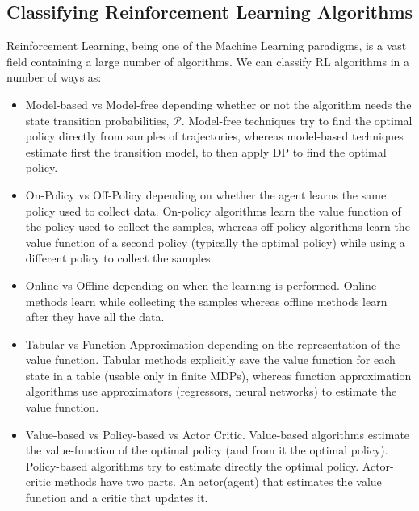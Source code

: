 \subsection{Classifying Reinforcement Learning Algorithms}
Reinforcement Learning, being one of the Machine Learning paradigms, is a vast field containing a large number of algorithms. We can classify RL algorithms in a number of ways as:
\begin{itemize}
\item Model-based vs Model-free depending whether or not the algorithm needs the state transition probabilities, $\mathcal{P}$. Model-free techniques try to find the optimal policy directly from samples of trajectories, whereas model-based techniques estimate first the transition model, to then apply DP to find the optimal policy.
\item On-Policy vs Off-Policy depending on whether the agent learns the same policy used to collect data. On-policy algorithms learn the value function of the policy used to collect the samples, whereas off-policy algorithms learn the value function of a second policy (typically the optimal policy) while using a different policy to collect the samples.\
\item Online vs Offline depending on when the learning is performed. Online methods learn while collecting the samples whereas offline methods learn after they have all the data.
\item Tabular vs Function Approximation depending on the representation of the value function. Tabular methods explicitly save the value function for each state in a table (usable only in finite MDPs), whereas function approximation algorithms use approximators (regressors, neural networks) to estimate the value function.
\item Value-based vs Policy-based vs Actor Critic. Value-based algorithms estimate the value-function of the optimal policy (and from it the optimal policy). Policy-based algorithms try to estimate directly the optimal policy. Actor-critic methods have two parts. An actor(agent) that estimates the value function and a critic that updates it.
\end{itemize}
